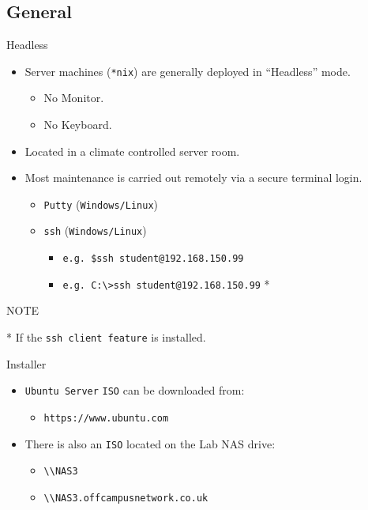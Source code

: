 \documentclass[aspectratio=169]{beamer}
\begin{document}
\subsection{General}
\begin{frame}{Headless}
  \begin{itemize}
    \item Server machines (\texttt{*nix}) are generally deployed in ``Headless'' mode.
    \begin{itemize}
      \item No Monitor.
      \item No Keyboard.
      \end{itemize}
    \item Located in a climate controlled server room.
    \item Most maintenance is carried out remotely via a secure terminal login.
      \begin{itemize}
        \item \texttt{Putty} (\texttt{Windows/Linux})
        \item \texttt{ssh} (\texttt{Windows/Linux})
          \begin{itemize}
            \item \texttt{e.g. \$ssh student@192.168.150.99}
            \item \texttt{e.g. C:\textbackslash\textgreater ssh student@192.168.150.99} *
          \end{itemize}
        \end{itemize}
  \end{itemize}
  \begin{block}{NOTE}
    \begin{center}
      * If the \texttt{ssh client feature} is installed.    
    \end{center}
  \end{block}
\end{frame}

\begin{frame}{Installer}
  \begin{itemize}
    \item \texttt{Ubuntu Server} \texttt{ISO} can be downloaded from:
      \begin{itemize}
        \item \texttt{https://www.ubuntu.com}
      \end{itemize}
    \item There is also an \texttt{ISO} located on the Lab NAS drive:
      \begin{itemize}
        \item \texttt{\textbackslash\textbackslash NAS3}
        \item \texttt{\textbackslash\textbackslash NAS3.offcampusnetwork.co.uk}
      \end{itemize}
  \end{itemize}
\end{frame}
\end{document}
